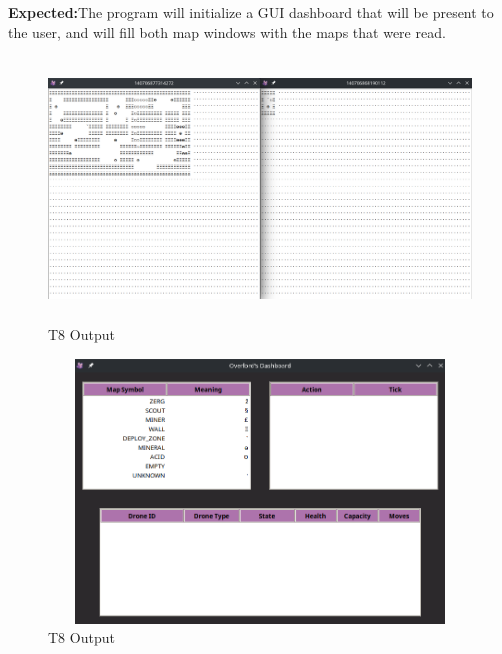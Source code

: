 \documentclass{article}
\begin{document}
\begin{description}
    \textbf{Expected:}{The program will initialize a GUI dashboard that will be present to the user, and will fill both map windows with the maps that were read.}
    \begin{figure}[htp]
    \includegraphics[width=15cm, height=7cm]{testcase8-1.png}
    
    \caption{T8 Output}
    \label{fig:galaxy}
\end{figure}
    \begin{figure}[htp]
    \includegraphics[width=15cm, height=7cm]{testcase8-2.png}
    
    \caption{T8 Output}
    \label{fig:galaxy}
\end{figure}
\end{description}
\end{document}

